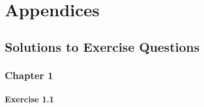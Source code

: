 \documentclass[11pt,fleqn]{book} %
\begin{document}
\part{Appendices}


\chapter*{Solutions to Exercise Questions}
\setlength{\parindent}{0pt} %

\section*{Chapter 1}

\subsection*{Exercise 1.1}
\end{document}

